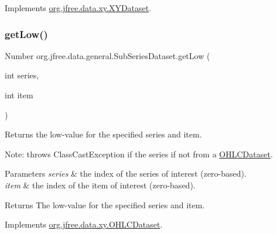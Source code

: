Implements \mbox{\hyperlink{interfaceorg_1_1jfree_1_1data_1_1xy_1_1_x_y_dataset_ae81f9de91dfcae45028fc8a486a119da}{org.\+jfree.\+data.\+xy.\+X\+Y\+Dataset}}.

\mbox{\label{classorg_1_1jfree_1_1data_1_1general_1_1_sub_series_dataset_a317d15536060c58dbe89de699b605fc6}} 
\subsubsection{\texorpdfstring{get\+Low()}{getLow()}}
{\footnotesize\ttfamily Number org.\+jfree.\+data.\+general.\+Sub\+Series\+Dataset.\+get\+Low (\begin{DoxyParamCaption}\item[{int}]{series,  }\item[{int}]{item }\end{DoxyParamCaption})}

Returns the low-\/value for the specified series and item. 

Note\+: throws {\ttfamily Class\+Cast\+Exception} if the series if not from a \mbox{\hyperlink{}{O\+H\+L\+C\+Dataset}}.


\begin{DoxyParams}{Parameters}
{\em series} & the index of the series of interest (zero-\/based). \\
\hline
{\em item} & the index of the item of interest (zero-\/based).\\
\hline
\end{DoxyParams}
\begin{DoxyReturn}{Returns}
The low-\/value for the specified series and item. 
\end{DoxyReturn}


Implements \mbox{\hyperlink{interfaceorg_1_1jfree_1_1data_1_1xy_1_1_o_h_l_c_dataset_a87d7730829e66f23a2601c3519cf828a}{org.\+jfree.\+data.\+xy.\+O\+H\+L\+C\+Dataset}}.

\mbox{\label{classorg_1_1jfree_1_1data_1_1general_1_1_sub_series_dataset_ad14de9483cb4c2fa324f6064a6659228}} 
